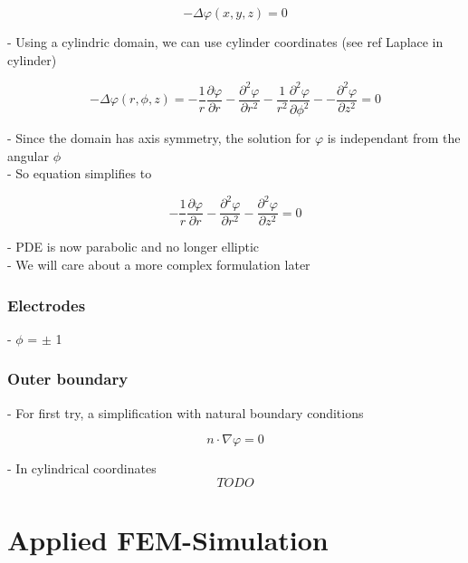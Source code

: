 \documentclass[parskip=half, titlepage=yes, 12pt, BCOR=12mm, DIV=calc]{scrartcl}
\begin{document}
\begin{equation}
    - \Delta \varphi(x,y,z) = 0
\end{equation}

- Using a cylindric domain, we can use cylinder coordinates (see ref Laplace in cylinder)

\begin{equation}
    - \Delta \varphi(r,\phi,z) = - \frac{1}{r} \frac{\partial \varphi}{\partial r} - \frac{\partial^2 \varphi}{\partial r^2} - \frac{1}{r^2} \frac{\partial^2 \varphi}{\partial \phi^2} - - \frac{\partial^2 \varphi}{\partial z^2}  = 0
\end{equation}

- Since the domain has axis symmetry, the solution for $\varphi$ is independant from the angular $\phi$ \\
- So equation simplifies to

\begin{equation}
    - \frac{1}{r} \frac{\partial \varphi}{\partial r} - \frac{\partial^2 \varphi}{\partial r^2} - \frac{\partial^2 \varphi}{\partial z^2} = 0
\end{equation}

- PDE is now parabolic and no longer elliptic \\
- We will care about a more complex formulation later 


\subsubsection{Electrodes}

- $\phi$ = $\pm$ 1

\subsubsection{Outer boundary}

- For first try, a simplification with natural boundary conditions

\begin{equation}
    n \cdot \nabla \varphi = 0
\end{equation}

- In cylindrical coordinates
\begin{equation}
    TODO
\end{equation}



\section{Applied FEM-Simulation}
\end{document}
